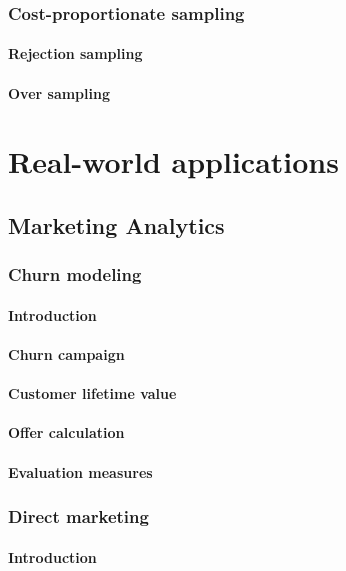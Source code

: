 \documentclass[twoside,openright,titlepage,numbers=noenddot,headinclude,%
               footinclude=true,cleardoublepage=empty,abstractoff,BCOR=5mm,%
               paper=a4,fontsize=11pt,ngerman,american]{scrreprt}
\numberwithin{theorem}{chapter}
\numberwithin{definition}{chapter}
\numberwithin{algorithm}{chapter}
\numberwithin{figure}{chapter}
\numberwithin{table}{chapter}
\numberwithin{equation}{chapter}
\begin{document}
		\section{Cost-proportionate sampling}
			\subsection{Rejection sampling}
			\subsection{Over sampling}

\part{Real-world applications}

	\cleardoublepage

	\chapter{Marketing Analytics}
		\section{Churn modeling}
			\subsection{Introduction}
			\subsection{Churn campaign}
			\subsection{Customer lifetime value}
			\subsection{Offer calculation}
			\subsection{Evaluation measures}
		\section{Direct marketing}
			\subsection{Introduction}
\end{document}
